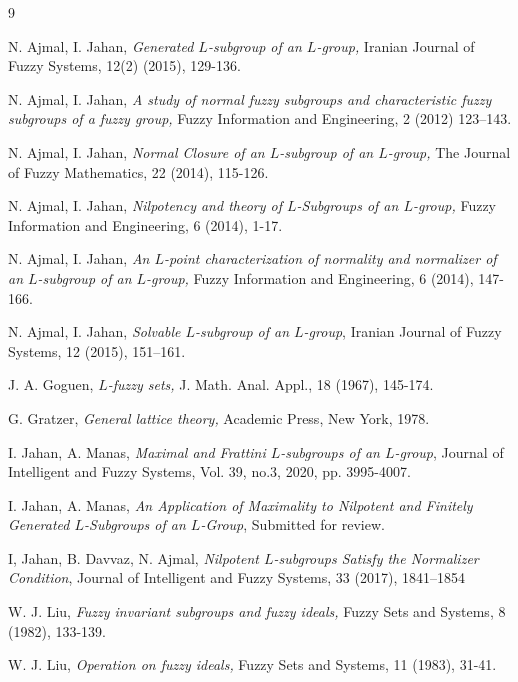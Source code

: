 \documentclass[10pt]{article}
\theoremstyle{plain}
\theoremstyle{definition}
\theoremstyle{remark}
\theoremstyle{case}
\begin{document}
\begin{thebibliography}{9}
	
	
	
	N. Ajmal, I. Jahan,
	\textit{Generated $L$-subgroup of an $L$-group,} Iranian Journal of Fuzzy Systems, 12(2) (2015), 129-136.
	
	N. Ajmal, I. Jahan, \textit {A study of normal fuzzy subgroups and characteristic fuzzy subgroups of a fuzzy group,} Fuzzy Information and Engineering, 2 (2012) 123–143.
	
	
	N. Ajmal, I. Jahan,
	\textit{Normal Closure of an $L$-subgroup of an $L$-group,}
	The Journal of Fuzzy Mathematics, 22 (2014), 115-126.
	
	N. Ajmal, I. Jahan,
	\textit{Nilpotency and theory of $L$-Subgroups of an $L$-group,}
	Fuzzy Information and Engineering, 6 (2014), 1-17.
	
	N. Ajmal, I. Jahan,
	\textit{An $L$-point characterization of normality and normalizer of an $L$-subgroup of an $L$-group,}
	Fuzzy Information and Engineering,  6 (2014), 147-166.
	
	N. Ajmal, I. Jahan,
	\textit{Solvable $L$-subgroup of an $L$-group},
	Iranian Journal of Fuzzy Systems,  12 (2015), 151--161.
	
	
	
	J. A. Goguen, 
	\textit{$L$-fuzzy sets,} 
	J. Math. Anal. Appl., 18 (1967), 145-174.
	
	G. Gratzer, \textit{General lattice theory,} Academic Press, New York, 1978.
	
	I. Jahan, A. Manas, 
	\textit{Maximal and Frattini $L$-subgroups of an $L$-group}, 
	Journal of Intelligent and Fuzzy Systems, Vol. 39, no.3, 2020, pp. 3995-4007.
	
	I. Jahan, A. Manas,
	\textit{An Application of Maximality to Nilpotent and Finitely Generated  $L$-Subgroups of an $L$-Group},
	Submitted for review.
	
	I, Jahan, B. Davvaz, N. Ajmal,
	\textit{Nilpotent $L$-subgroups Satisfy the Normalizer Condition},
	Journal of Intelligent and Fuzzy Systems, 33 (2017), 1841–1854
	
	W. J. Liu, 
	\textit{Fuzzy invariant subgroups and fuzzy ideals,} Fuzzy Sets and Systems, 8 (1982), 133-139.
	
	
	W. J. Liu,
	\textit{Operation on fuzzy ideals,}
	Fuzzy Sets and Systems, 11 (1983), 31-41.
	

\end{thebibliography}
\end{document}
